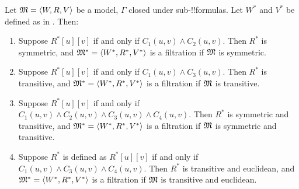 \documentclass[../../../include/open-logic-section]{subfiles}
\begin{document}
\begin{thm}
  Let $\mModel{M} =\tuple{W,R,V}$ be a model, $\Gamma$ closed under
  sub-!!{formula}s. Let $W^*$ and $V^*$ be defined as in
  . Then:
  \begin{enumerate}
  \item Suppose $R^*[u][v]$ if and only if $C_1(u, v) \land
    C_2(u,v)$. Then $R^*$ is symmetric, and $\mModel{M^*} =
    \tuple{W^*,R^*,V^*}$ is a filtration if $\mModel{M}$ is symmetric.
  \item Suppose $R^*[u][v]$ if and only if $C_1(u, v)
    \land C_3(u,v)$. Then $R^*$ is transitive, and
    $\mModel{M^*}=\tuple{W^*,R^*,V^*}$ is a filtration if $\mModel{M}$
    is transitive.
  \item Suppose $R^*[u][v]$ if and only if $C_1(u, v) \land C_2(u,v)
    \land C_3(u,v) \land C_4(u,v)$. Then $R^*$ is symmetric and
    transitive, and $\mModel{M^*}=\tuple{W^*,R^*,V^*}$ is a filtration
    if $\mModel{M}$ is symmetric and transitive.
  \item Suppose $R^*$ is defined as $R^*[u][v]$ if and only if $C_1(u,
    v) \land C_3(u,v) \land C_4(u,v)$. Then $R^*$ is transitive and
    euclidean, and $\mModel{M^*}=\tuple{W^*,R^*,V^*}$ is a filtration
    if $\mModel{M}$ is transitive and euclidean.
  \end{enumerate}
\end{thm}
\end{document}
